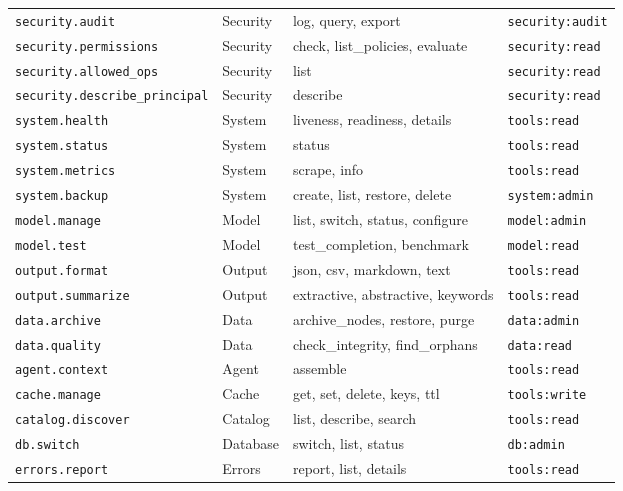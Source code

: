 \begin{longtable}{llp{4cm}l}
    \texttt{security.audit} & Security & log, query, export & \texttt{security:audit} \\
    \texttt{security.permissions} & Security & check, list\_policies, evaluate & \texttt{security:read} \\
    \texttt{security.allowed\_ops} & Security & list & \texttt{security:read} \\
    \texttt{security.describe\_principal} & Security & describe & \texttt{security:read} \\
    \midrule
    \texttt{system.health} & System & liveness, readiness, details & \texttt{tools:read} \\
    \texttt{system.status} & System & status & \texttt{tools:read} \\
    \texttt{system.metrics} & System & scrape, info & \texttt{tools:read} \\
    \texttt{system.backup} & System & create, list, restore, delete & \texttt{system:admin} \\
    \midrule
    \texttt{model.manage} & Model & list, switch, status, configure & \texttt{model:admin} \\
    \texttt{model.test} & Model & test\_completion, benchmark & \texttt{model:read} \\
    \midrule
    \texttt{output.format} & Output & json, csv, markdown, text & \texttt{tools:read} \\
    \texttt{output.summarize} & Output & extractive, abstractive, keywords & \texttt{tools:read} \\
    \midrule
    \texttt{data.archive} & Data & archive\_nodes, restore, purge & \texttt{data:admin} \\
    \texttt{data.quality} & Data & check\_integrity, find\_orphans & \texttt{data:read} \\
    \midrule
    \texttt{agent.context} & Agent & assemble & \texttt{tools:read} \\
    \midrule
    \texttt{cache.manage} & Cache & get, set, delete, keys, ttl & \texttt{tools:write} \\
    \midrule
    \texttt{catalog.discover} & Catalog & list, describe, search & \texttt{tools:read} \\
    \midrule
    \texttt{db.switch} & Database & switch, list, status & \texttt{db:admin} \\
    \midrule
    \texttt{errors.report} & Errors & report, list, details & \texttt{tools:read} \\

\end{longtable}
